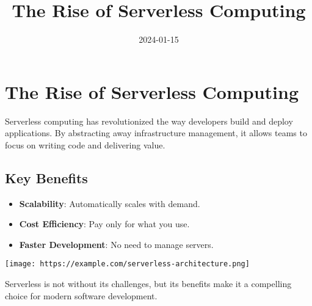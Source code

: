 \title{The Rise of Serverless Computing}
\date{2024-01-15}

\section*{The Rise of Serverless Computing}

Serverless computing has revolutionized the way developers build and deploy applications. By abstracting away infrastructure management, it allows teams to focus on writing code and delivering value.

\subsection*{Key Benefits}

\begin{itemize}
  \item \textbf{Scalability}: Automatically scales with demand.
  \item \textbf{Cost Efficiency}: Pay only for what you use.
  \item \textbf{Faster Development}: No need to manage servers.
\end{itemize}

\texttt{[image: https://example.com/serverless-architecture.png]}

Serverless is not without its challenges, but its benefits make it a compelling choice for modern software development.